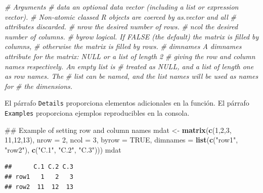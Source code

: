 \documentclass[]{book}
\newenvironment{Shaded}{\begin{snugshade}}{\end{snugshade}}
\newcommand{\KeywordTok}[1]{\textcolor[rgb]{0.13,0.29,0.53}{\textbf{#1}}}
\newcommand{\DataTypeTok}[1]{\textcolor[rgb]{0.13,0.29,0.53}{#1}}
\newcommand{\DecValTok}[1]{\textcolor[rgb]{0.00,0.00,0.81}{#1}}
\newcommand{\StringTok}[1]{\textcolor[rgb]{0.31,0.60,0.02}{#1}}
\newcommand{\CommentTok}[1]{\textcolor[rgb]{0.56,0.35,0.01}{\textit{#1}}}
\newcommand{\OtherTok}[1]{\textcolor[rgb]{0.56,0.35,0.01}{#1}}
\newcommand{\NormalTok}[1]{#1}
\begin{document}
\begin{Shaded}
\begin{Highlighting}[]
\CommentTok{# Arguments}
\CommentTok{# data      an optional data vector (including a list or expression vector). }
\CommentTok{#           Non-atomic classed R objects are coerced by as.vector and all }
\CommentTok{#           attributes discarded.}
\CommentTok{# nrow      the desired number of rows.}
\CommentTok{# ncol      the desired number of columns.}
\CommentTok{# byrow     logical. If FALSE (the default) the matrix is filled by columns, }
\CommentTok{#           otherwise the matrix is filled by rows.}
\CommentTok{# dimnames  A dimnames attribute for the matrix: NULL or a list of length 2 }
\CommentTok{#           giving the row and column names respectively. An empty list is }
\CommentTok{#           treated as NULL, and a list of length one as row names. The }
\CommentTok{#           list can be named, and the list names will be used as names for }
\CommentTok{#           the dimensions.}
\end{Highlighting}
\end{Shaded}

El párrafo \texttt{Details} proporciona elementos adicionales en la
función. El párrafo \texttt{Examples} proporciona ejemplos reproducibles
en la consola.

\begin{Shaded}
\begin{Highlighting}[]
\NormalTok{## Example of setting row and column names}
\NormalTok{mdat <-}\StringTok{ }\KeywordTok{matrix}\NormalTok{(}\KeywordTok{c}\NormalTok{(}\DecValTok{1}\NormalTok{,}\DecValTok{2}\NormalTok{,}\DecValTok{3}\NormalTok{, }\DecValTok{11}\NormalTok{,}\DecValTok{12}\NormalTok{,}\DecValTok{13}\NormalTok{), }\DataTypeTok{nrow =} \DecValTok{2}\NormalTok{, }\DataTypeTok{ncol =} \DecValTok{3}\NormalTok{, }\DataTypeTok{byrow =} \OtherTok{TRUE}\NormalTok{,}
               \DataTypeTok{dimnames =} \KeywordTok{list}\NormalTok{(}\KeywordTok{c}\NormalTok{(}\StringTok{"row1"}\NormalTok{, }\StringTok{"row2"}\NormalTok{),}
                               \KeywordTok{c}\NormalTok{(}\StringTok{"C.1"}\NormalTok{, }\StringTok{"C.2"}\NormalTok{, }\StringTok{"C.3"}\NormalTok{)))}
\NormalTok{mdat}
\end{Highlighting}
\end{Shaded}

\begin{verbatim}
##      C.1 C.2 C.3
## row1   1   2   3
## row2  11  12  13
\end{verbatim}
\end{document}
